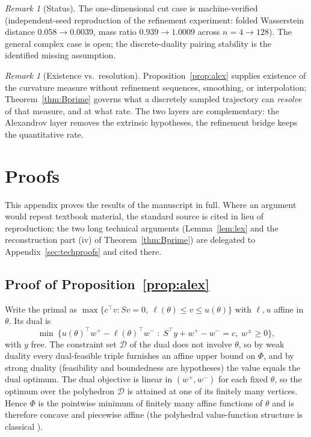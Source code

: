 \documentclass[11pt,a4paper]{article}
\theoremstyle{plain}
\theoremstyle{definition}
\theoremstyle{remark}
\newtheorem{remark}[theorem]{Remark}
\begin{document}
\begin{remark}[Status]
The one-dimensional cut case is machine-verified (independent-seed
reproduction of the refinement experiment: folded Wasserstein distance
$0.058 \to 0.0039$, mass ratio $0.939 \to 1.0009$ across
$n = 4 \to 128$). The general complex case is open; the discrete-duality
pairing stability is the identified missing assumption.
\end{remark}

\begin{remark}[Existence vs.\ resolution]
Proposition~\ref{prop:alex} supplies existence of the curvature measure
without refinement sequences, smoothing, or interpolation; Theorem~\ref{thm:Bprime} governs what a discretely sampled trajectory can \emph{resolve} of that
measure, and at what rate. The two layers are complementary: the
Alexandrov layer removes the extrinsic hypotheses, the refinement
bridge keeps the quantitative rate.
\end{remark}

\section{Proofs}\label{sec:proofs}

This appendix proves the results of the manuscript in full. Where an
argument would repeat textbook material, the standard source is cited
in lieu of reproduction; the two long technical arguments
(Lemma~\ref{lem:lex} and the reconstruction part (iv) of
Theorem~\ref{thm:Bprime}) are delegated to
Appendix~\ref{sec:techproofs} and cited there.

\subsection{Proof of Proposition~\ref{prop:alex}}

Write the primal as $\max\{c^\top v : Sv = 0,\ \ell(\theta) \le v
\le u(\theta)\}$ with $\ell, u$ affine in $\theta$. Its dual is
\[
\min\ \bigl\{u(\theta)^\top w^{+} - \ell(\theta)^\top w^{-}
\;:\; S^\top y + w^{+} - w^{-} = c,\; w^{\pm} \ge 0\bigr\},
\]
with $y$ free. The constraint set $\mathcal{D}$ of the dual does not
involve $\theta$, so by weak duality every dual-feasible triple
furnishes an affine upper bound on $\Phi$, and by strong duality
(feasibility and boundedness are hypotheses) the value equals the
dual optimum. The dual objective is linear in $(w^{+}, w^{-})$ for
each fixed $\theta$, so the optimum over the polyhedron
$\mathcal{D}$ is attained at one of its finitely many vertices.
Hence $\Phi$ is the pointwise minimum of finitely many affine
functions of $\theta$ and is therefore concave and piecewise affine
(the polyhedral value-function structure is classical
\citep{rockafellar1970, borrelli2003}).
\end{document}
